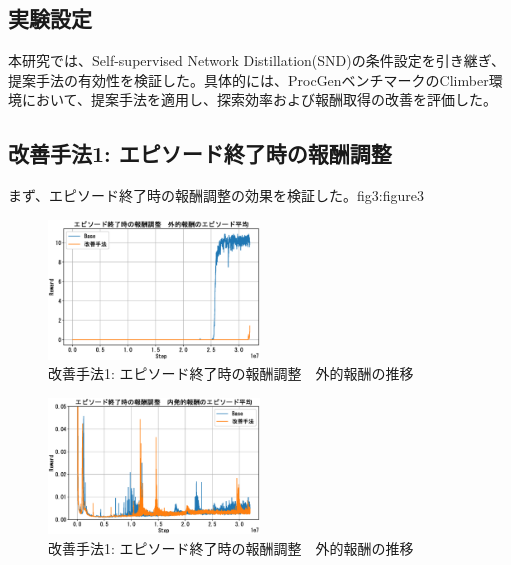 \subsection{実験設定}
本研究では、Self-supervised Network Distillation(SND)\cite{SND}の条件設定を引き継ぎ、提案手法の有効性を検証した。具体的には、ProcGenベンチマークのClimber環境において、提案手法を適用し、探索効率および報酬取得の改善を評価した。

\subsection{改善手法1: エピソード終了時の報酬調整}
まず、エピソード終了時の報酬調整の効果を検証した。{fig3:figure3}
\begin{figure}[t]
   \centering
   \includegraphics[width=0.5\textwidth]{Method1_Ext.eps}
   \caption{改善手法1: エピソード終了時の報酬調整　外的報酬の推移}\label{fig3:figure3}
\end{figure}
\begin{figure}[t]
   \centering
   \includegraphics[width=0.5\textwidth]{Method1_Intr.eps}
   \caption{改善手法1: エピソード終了時の報酬調整　外的報酬の推移}\label{fig4:figure4}
\end{figure}


